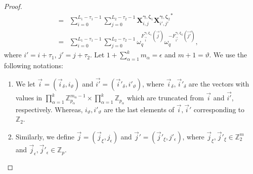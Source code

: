 \documentclass[10pt,a4paper]{amsart}
\theoremstyle{plain}
\begin{document}
\begin{proof}
\begin{equation}
\begin{split}
				= &\sum_{i=0}^{L_1 -\tau_1-1} \sum_{j=0}^{L_2-\tau_2-1} \mathbf{X}^{\bm{\gamma}, \bm{\zeta}_1}_{i,j} {\mathbf{X}^{\bm{\gamma}, \bm{\zeta}_2}_{i', j'}}^*\\
				=& \sum_{i=0}^{L_1 -\tau_1-1} \sum_{j=0}^{L_2-\tau_2-1} \omega_q^{ 	F_{ \vec{i}}^{\bm{\gamma}, \bm{\zeta}_1} (\vec{j}) } \omega_q^{ 	-F_{ \vec{i'}}^{\bm{\gamma}, \bm{\zeta}_2} (\vec{j'}) },
			\end{split}
		\end{equation}
		where $i'=i+ \tau_1$, $j'=j+\tau_2$. Let $1+ \sum_{\alpha=1}^{k} m_\alpha= \epsilon$ and $m+1= \vartheta$. 
		We use the following notations:
		\begin{enumerate}
			\item We let $\vec{i}= (\vec{i}_{\delta}, i_{\vartheta}) $ and  $\vec{i'}= (\vec{i}'_{\delta}, i'_{\vartheta}) $, where $\vec{i}_{\delta}, \vec{i}'_{\delta}$ are the vectors with values in $\prod_{\alpha=1}^{k} \mathbb{Z}_{p_\alpha}^{m_\alpha-1} \times \prod_{\alpha=1}^{k} \mathbb{Z}_{p_\alpha}$ which are truncated from $\vec{i}$ and $\vec{i'}$, respectively.
			Whereas, $i_{\vartheta}, i'_{\vartheta}$ are the last elements of $\vec{i}, \vec{i}'$ corresponding to $\mathbb{Z}_2$.
			
			\item Similarly, we define $\vec{j}=(\vec{j}_{\xi}, j_{\epsilon})$ and $\vec{j}'=(\vec{j}'_{\xi}, j'_{\epsilon})$, where $\vec{j}_{\xi}, \vec{j}'_{\xi} \in \mathbb{Z}_2^m$ and $\vec{j}_{\epsilon}, \vec{j}'_{\epsilon} \in \mathbb{Z}_p$.  
			

\end{enumerate}
\end{proof}
\end{document}
